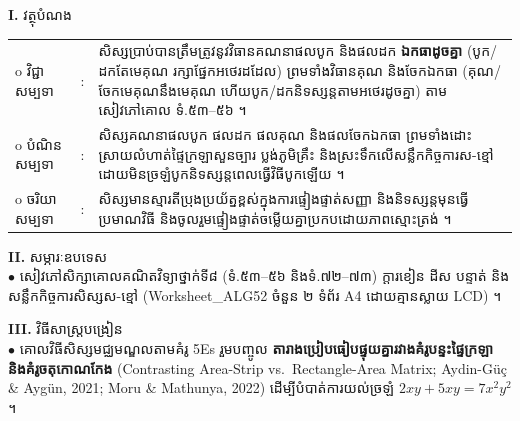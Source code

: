 \documentclass[a4paper,10pt]{article}
\newcommand{\wcirc}{{\CourierBullet\fontsize{9.5pt}{11pt}\selectfont o}}
\newcommand{\en}[1]{{\TimesEn #1}}
\begin{document}
\textbf{I.} {\muol វត្ថុបំណង}\\[1pt]
\hspace*{0.55cm}%
\begin{tabular}{@{}l l L{14.2cm}@{}}
  \wcirc \hspace{0.25cm} វិជ្ជាសម្បទា & : & សិស្សប្រាប់បានត្រឹមត្រូវនូវវិធានគណនាផលបូក និងផលដក \textbf{ឯកធាដូចគ្នា} (បូក/ដកតែមេគុណ រក្សាផ្នែកអថេរដដែល) ព្រមទាំងវិធានគុណ និងចែកឯកធា (គុណ/ចែកមេគុណនឹងមេគុណ ហើយបូក/ដកនិទស្សន្តតាមអថេរដូចគ្នា) តាមសៀវភៅគោល ទំ.៥៣--៥៦ ។ \\
  \wcirc \hspace{0.25cm} បំណិនសម្បទា & : & សិស្សគណនាផលបូក ផលដក ផលគុណ និងផលចែកឯកធា ព្រមទាំងដោះស្រាយលំហាត់ផ្ទៃក្រឡាសួនច្បារ ប្លង់ភូមិគ្រឹះ និងស្រះទឹកលើសន្លឹកកិច្ចការស-ខ្មៅដោយមិនច្រឡំបូកនិទស្សន្តពេលធ្វើវិធីបូកឡើយ ។ \\
  \wcirc \hspace{0.25cm} ចរិយាសម្បទា & : & សិស្សមានស្មារតីប្រុងប្រយ័ត្នខ្ពស់ក្នុងការផ្ទៀងផ្ទាត់សញ្ញា និងនិទស្សន្តមុនធ្វើប្រមាណវិធី និងចូលរួមផ្ទៀងផ្ទាត់ចម្លើយគ្នាប្រកបដោយភាពស្មោះត្រង់ ។ \\
\end{tabular}

\vspace{1pt}

\textbf{II.} {\muol សម្ភារៈឧបទេស}\\[1pt]
\hspace*{0.55cm}$\bullet$ \hspace{0.35cm} សៀវភៅសិក្សាគោលគណិតវិទ្យាថ្នាក់ទី៨ (ទំ.៥៣--៥៦ និងទំ.៧២--៧៣) ក្ដារខៀន ដីស បន្ទាត់ និងសន្លឹកកិច្ចការសិស្សស-ខ្មៅ (\en{Worksheet\_ALG52} ចំនួន ២ ទំព័រ \en{A4} ដោយគ្មានស្លាយ \en{LCD}) ។

\vspace{1pt}

\textbf{III.} {\muol វិធីសាស្រ្តបង្រៀន}\\[1pt]
\hspace*{0.55cm}$\bullet$ \hspace{0.35cm} គោលវិធីសិស្សមជ្ឈមណ្ឌលតាមគំរូ \en{5Es} រួមបញ្ចូល \textbf{តារាងប្រៀបធៀបផ្ទុយគ្នារវាងគំរូបន្ទះផ្ទៃក្រឡា និងគំរូចតុកោណកែង} (\en{Contrasting Area-Strip vs.\ Rectangle-Area Matrix}; \en{Aydin-G\"u\c{c} \& Ayg\"un, 2021; Moru \& Mathunya, 2022}) ដើម្បីបំបាត់ការយល់ច្រឡំ $2xy+5xy=7x^2y^2$ ។

\vspace{2pt}
\end{document}
